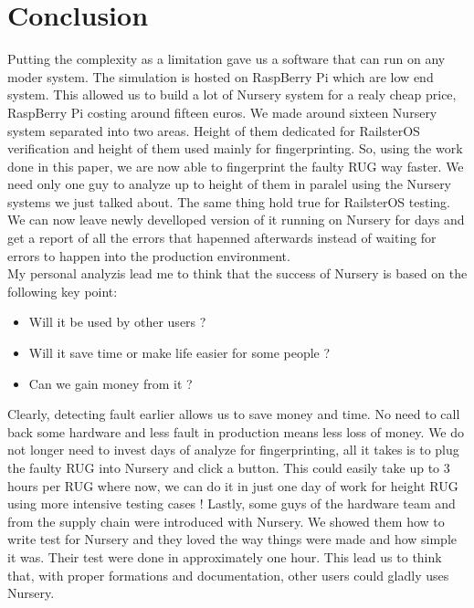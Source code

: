 \documentclass[12pt]{article}
\begin{document}
\clearpage
\part{Conclusion}

Putting the complexity as a limitation gave us a software that can run on any moder system. The simulation is hosted on RaspBerry Pi which are low end system. This allowed us to build a lot of Nursery system for a realy cheap price, RaspBerry Pi costing around fifteen euros. We made around sixteen Nursery system separated into two areas. Height of them dedicated for RailsterOS verification and height of them used mainly for fingerprinting. So, using the work done in this paper, we are now able to fingerprint the faulty RUG way faster. We need only one guy to analyze up to height of them in paralel using the Nursery systems we just talked about. The same thing hold true for RailsterOS testing. We can now leave newly develloped version of it running on Nursery for days and get a report of all the errors that hapenned afterwards instead of waiting for errors to happen into the production environment.\\

My personal analyzis lead me to think that the success of Nursery is based on the following key point:
\begin{itemize}
\item Will it be used by other users ?
\item Will it save time or make life easier for some people ?
\item Can we gain money from it ?
\end{itemize}

Clearly, detecting fault earlier allows us to save money and time. No need to call back some hardware and less fault in production means less loss of money. We do not longer need to invest days of analyze for fingerprinting, all it takes is to plug the faulty RUG into Nursery and click a button. This could easily take up to 3 hours per RUG where now, we can do it in just one day of work for height RUG using more intensive testing cases ! Lastly, some guys of the hardware team and from the supply chain were introduced with Nursery. We showed them how to write test for Nursery and they loved the way things were made and how simple it was. Their test were done in approximately one hour. This lead us to think that, with proper formations and documentation, other users could gladly uses Nursery.\\
\end{document}
